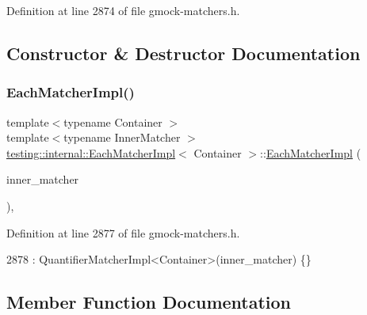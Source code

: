 Definition at line 2874 of file gmock-\/matchers.\+h.



\subsection{Constructor \& Destructor Documentation}
\mbox{\label{classtesting_1_1internal_1_1EachMatcherImpl_afe41214bf055abcdd60e475f207c7a0f}} 
\subsubsection{\texorpdfstring{Each\+Matcher\+Impl()}{EachMatcherImpl()}}
{\footnotesize\ttfamily template$<$typename Container $>$ \\
template$<$typename Inner\+Matcher $>$ \\
\hyperlink{classtesting_1_1internal_1_1EachMatcherImpl}{testing\+::internal\+::\+Each\+Matcher\+Impl}$<$ Container $>$\+::\hyperlink{classtesting_1_1internal_1_1EachMatcherImpl}{Each\+Matcher\+Impl} (\begin{DoxyParamCaption}\item[{Inner\+Matcher}]{inner\+\_\+matcher }\end{DoxyParamCaption})\hspace{0.3cm}{\ttfamily [inline]}, {\ttfamily [explicit]}}



Definition at line 2877 of file gmock-\/matchers.\+h.


\begin{DoxyCode}
2878       : QuantifierMatcherImpl<Container>(inner\_matcher) \{\}
\end{DoxyCode}


\subsection{Member Function Documentation}
\mbox{\label{classtesting_1_1internal_1_1EachMatcherImpl_a5be5bbd61f7a350fcbe30deea4c2a0c6}} 
